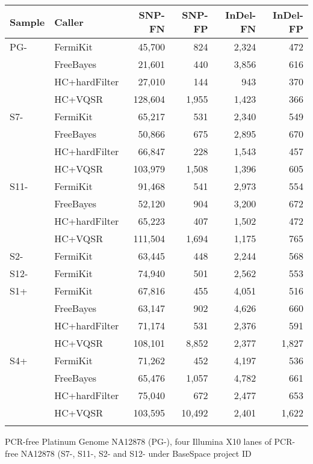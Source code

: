 \documentclass{bioinfo}
\begin{document}
\begin{table}[htb]
{\footnotesize
\begin{tabular}{lp{1.7cm}rrrr}
\toprule
Sample & Caller     & SNP-FN & SNP-FP & InDel-FN & InDel-FP \\
\midrule
PG- & FermiKit      & 45,700 & 824    & 2,324    & 472 \\
	& FreeBayes     & 21,601 & 440    & 3,856    & 616 \\
    & HC+hardFilter & 27,010 & 144    & 943      & 370 \\
	& HC+VQSR       & 128,604& 1,955  & 1,423    & 366 \\
S7- & FermiKit      & 65,217 & 531    & 2,340    & 549 \\
	& FreeBayes     & 50,866 & 675    & 2,895    & 670 \\
    & HC+hardFilter & 66,847 & 228    & 1,543    & 457 \\
	& HC+VQSR       & 103,979& 1,508  & 1,396    & 605 \\
S11-& FermiKit      & 91,468 & 541    & 2,973    & 554 \\
	& FreeBayes     & 52,120 & 904    & 3,200    & 672 \\
	& HC+hardFilter & 65,223 & 407    & 1,502    & 472 \\
	& HC+VQSR       & 111,504& 1,694  & 1,175    & 765 \\
S2- & FermiKit      & 63,445 & 448    & 2,244    & 568 \\
S12-& FermiKit      & 74,940 & 501    & 2,562    & 553 \\
S1+ & FermiKit      & 67,816 & 455    & 4,051    & 516 \\
	& FreeBayes     & 63,147 & 902    & 4,626    & 660 \\
    & HC+hardFilter & 71,174 & 531    & 2,376    & 591 \\
	& HC+VQSR       & 108,101& 8,852  & 2,377    & 1,827 \\
S4+ & FermiKit      & 71,262 & 452    & 4,197    & 536 \\
	& FreeBayes     & 65,476 & 1,057  & 4,782    & 661 \\
	& HC+hardFilter & 75,040 & 672    & 2,477    & 653 \\
	& HC+VQSR       & 103,595& 10,492 & 2,401    & 1,622 \\
\botrule
\end{tabular}}{PCR-free Platinum Genome NA12878 (PG-), four Illumina X10 lanes
of PCR-free NA12878 (S7-, S11-, S2- and S12- under BaseSpace project ID
}
\end{table}
\end{document}
